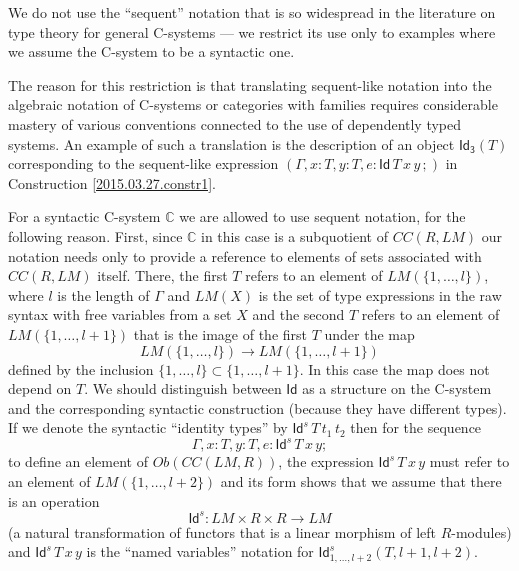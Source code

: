 \documentclass[12pt]{article}
\numberwithin{equation}{section}
\newcommand{\sr}{\rightarrow}
\newcommand{\toCC}{CC} %
\newcommand{\CC}{{\mathbb C}}  %
\newcommand{\p}{\mathsf{p}}
\newcommand{\Id}{\mathsf{Id}} %
\newcommand{\Idx}{\mathsf{Id_3}} %
\begin{document}
We do not use the ``sequent'' notation that is so widespread in the literature
on type theory for general C-systems --- we restrict its use only to examples where
we assume the C-system to be a syntactic one.

The reason for this restriction is that translating sequent-like notation
into the algebraic notation of C-systems or categories with families requires
considerable mastery of various conventions connected to the use of dependently
typed systems. An example of such a translation is the description of an object
$\Idx(T)$ corresponding to the sequent-like expression
$(\Gamma, x:T, y:T, e:\Id\, T\, x\, y\,;)$ in Construction \ref{2015.03.27.constr1}.


For a syntactic C-system $\CC$ we are allowed to use sequent notation, for the
following reason. First, since $\CC$ in this case is a subquotient of
$\toCC(R,LM)$ our notation needs only to provide a reference to elements of sets
associated with $\toCC(R,LM)$ itself.  There, the first $T$ refers to an element
of $LM(\{1,\dots,l\})$, where $l$ is the length of $\Gamma$ and $LM(X)$ is the
set of type expressions in the raw syntax with free variables from a set $X$
and the second $T$ refers to an element of $LM(\{1,\dots,l+1\})$ that is the
image of the first $T$ under the map
%
$$LM(\{1,\dots,l\})\sr LM(\{1,\dots,l+1\})$$
%
defined by the inclusion $\{1,\dots,l\}\subset \{1,\dots,l+1\}$. In this case
the map does not depend on $T$. We should distinguish between $\Id$ as a
structure on the C-system and the corresponding syntactic construction (because
they have different types). If we denote the syntactic ``identity types'' by
$\Id^s\, T\, t_1\, t_2$ then for the sequence
%
$$\Gamma, x:T, y:T, e:\Id^s\,T\,x\,y;$$
%
to define an element of $Ob(\toCC(LM,R))$, the expression $\Id^s\,T\,x\,y$ must
refer to an element of $LM(\{1,\dots,l+2\})$ and its form shows that we assume
that there is an operation
%
$$\Id^s:LM\times R\times R\sr LM$$
%
(a natural transformation of functors that is a linear morphism of left
$R$-modules) and $\Id^s\,T\,x\,y$ is the ``named variables'' notation for
$\Id^s_{{1,\dots,l+2}}(T,l+1,l+2)$.
\end{document}
